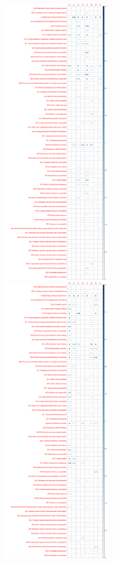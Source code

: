 \begin{figure}
\includegraphics[width=0.5\textwidth]{figs/diseases/experiment_1_health_outcome_t-test}
\includegraphics[width=0.5\textwidth]{figs/diseases/experiment_2_health_outcome_t-test}

\end{figure}
